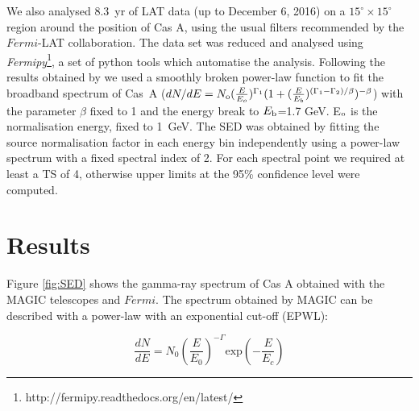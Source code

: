 \documentclass{PoS}
\newcommand{\pass}{{\sffamily{Pass 8}}}
\begin{document}
We also analysed 8.3~yr of LAT data (up to December 6, 2016) on a $15^\circ \times 15^\circ$ region around the position of Cas A, using the usual filters recommended by the $Fermi$-LAT collaboration. The data set was reduced and analysed using \emph{Fermipy}\footnote{http://fermipy.readthedocs.org/en/latest/}, a set of python tools which automatise the \pass{} analysis.
Following the results obtained by \cite{yuan_2013} we used a smoothly broken power-law function to fit the broadband spectrum of Cas~A ($dN/dE = N_{\rm o}(\frac{E}{E_o})^{\Gamma_1}(1+(\frac{E}{E_b})^{(\Gamma_1-\Gamma_2)/\beta})^{-\beta}$)  with the parameter $\beta$ fixed to 1 and the energy break to $E_
{\rm b}$=1.7 GeV. E$_{\rm o}$ is the normalisation energy, fixed to 1~GeV. The SED was obtained by fitting the source normalisation factor in each energy bin independently using a power-law spectrum with a fixed spectral index of 2. For each spectral point we required at least a TS of 4, otherwise upper limits at the 95\% confidence level were computed.



 

\section{Results}

Figure \ref{fig:SED} shows the gamma-ray spectrum of Cas A obtained with the MAGIC telescopes and $Fermi$. The spectrum obtained by MAGIC can be described with a power-law with an exponential cut-off (EPWL):

\begin{equation}\label{Eq:fit_EPWL}
\dfrac{dN}{dE} = N_0 \left( \dfrac{E}{E_0}\right)^{-\Gamma} \text{exp}\left(- \dfrac{E}{E_c} \right)
\end{equation}
\end{document}
